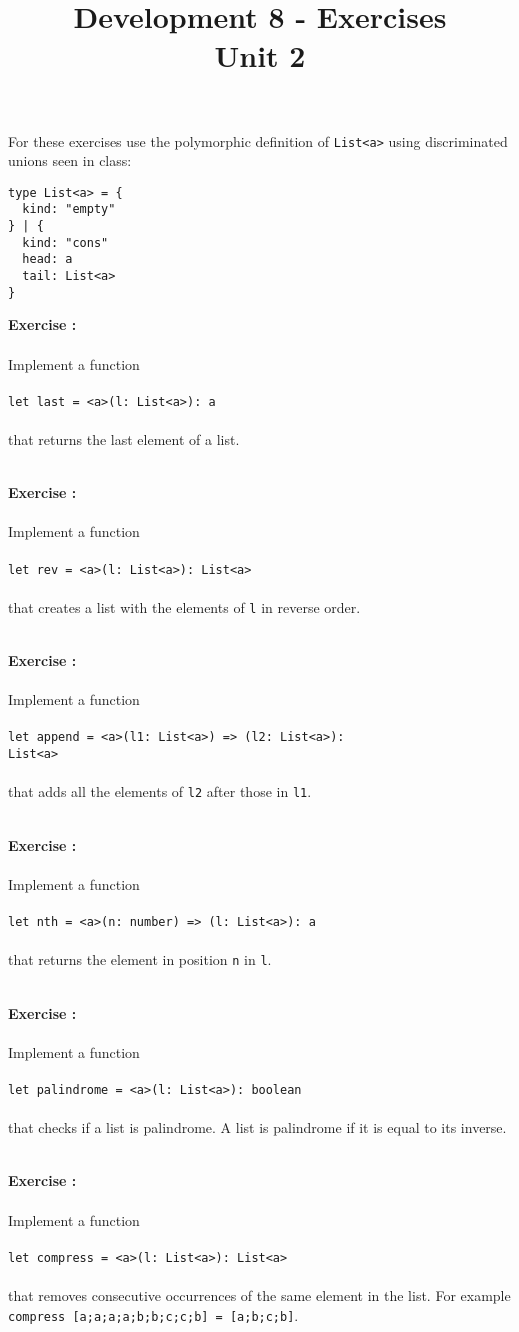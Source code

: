 \documentclass[]{article}
\title{Development 8 - Exercises\\Unit 2}
\author{}
\date{}
\newcounter{ExerciseCount}
\newcommand{\functionEx}[3]{
  Implement a function\\\\
   \texttt{let #1 = #2}\\\\ #3
}
\newcommand{\exercise}[1]{\noindent \textbf{Exercise \theExerciseCount:}\\\\ #1 \addtocounter{ExerciseCount}{1}
}
\begin{document}
\maketitle

\noindent
For these exercises use the polymorphic definition of \texttt{List<a>} using discriminated unions seen in class:

\begin{lstlisting}
type List<a> = {
  kind: "empty"
} | {
  kind: "cons"
  head: a
  tail: List<a>
}
\end{lstlisting}

\exercise{
  \functionEx{last}{<a>(l: List<a>): a}{
    that returns the last element of a list.
  }
}\\

\exercise{
  \functionEx{rev}{<a>(l: List<a>): List<a>}{
    that creates a list with the elements of \texttt{l} in reverse order.
  }
}\\

\exercise{
  \functionEx{append}{<a>(l1: List<a>) => (l2: List<a>):\\  List<a>}{
    that adds all the elements of \texttt{l2} after those in \texttt{l1}.
  }
}\\

\exercise{
  \functionEx{nth}{<a>(n: number) => (l: List<a>): a}{
    that returns the element in position \texttt{n} in \texttt{l}.
  }
}\\

\exercise{
  \functionEx{palindrome}{<a>(l: List<a>): boolean}{
    that checks if a list is palindrome. A list is palindrome if it is equal to its inverse.
  }
}\\

\exercise{
  \functionEx{compress}{<a>(l: List<a>): List<a>}{
    that removes consecutive occurrences of the same element in the list. For example \texttt{compress [a;a;a;a;b;b;c;c;b] = [a;b;c;b]}.
  }
}\\
\end{document}
